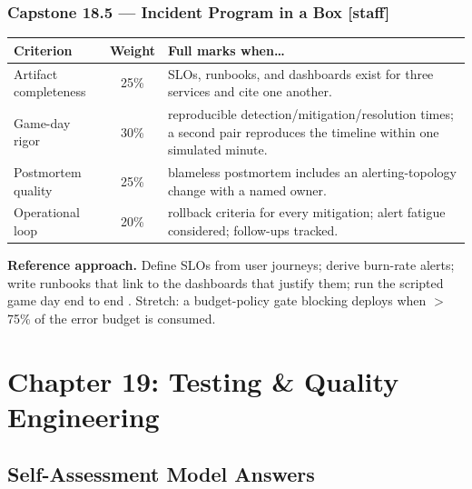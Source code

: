 \subsubsection*{Capstone 18.5 --- Incident Program in a Box [staff]}
\begin{center}\small
\begin{tabularx}{\textwidth}{l c X}
\toprule
\textbf{Criterion} & \textbf{Weight} & \textbf{Full marks when\ldots} \\
\midrule
Artifact completeness & 25\% & SLOs, runbooks, and dashboards exist for three services and cite one another. \\
Game-day rigor & 30\% & reproducible detection/mitigation/resolution times; a second pair reproduces the timeline within one simulated minute. \\
Postmortem quality & 25\% & blameless postmortem includes an alerting-topology change with a named owner. \\
Operational loop & 20\% & rollback criteria for every mitigation; alert fatigue considered; follow-ups tracked. \\
\bottomrule
\end{tabularx}
\end{center}
\textbf{Reference approach.} Define SLOs from user journeys; derive
burn-rate alerts; write runbooks that link to the dashboards that justify
them; run the scripted game day end to end \cite{beyer2016sre}. Stretch: a
budget-policy gate blocking deploys when $>$75\% of the error budget is
consumed.

\section{Chapter 19: Testing \& Quality Engineering}
\label{sec:sol-ch19}

\subsection{Self-Assessment Model Answers}

